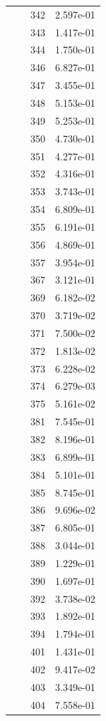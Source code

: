 \documentclass[12pt]{article}
\begin{document}
\begin{longtable}{@{}cccc@{}}
 &  & 342 & 2.597e-01 \\
 &  & 343 & 1.417e-01 \\
 &  & 344 & 1.750e-01 \\
 &  & 346 & 6.827e-01 \\
 &  & 347 & 3.455e-01 \\
 &  & 348 & 5.153e-01 \\
 &  & 349 & 5.253e-01 \\
 &  & 350 & 4.730e-01 \\
 &  & 351 & 4.277e-01 \\
 &  & 352 & 4.316e-01 \\
 &  & 353 & 3.743e-01 \\
 &  & 354 & 6.809e-01 \\
 &  & 355 & 6.191e-01 \\
 &  & 356 & 4.869e-01 \\
 &  & 357 & 3.954e-01 \\
 &  & 367 & 3.121e-01 \\
 &  & 369 & 6.182e-02 \\
 &  & 370 & 3.719e-02 \\
 &  & 371 & 7.500e-02 \\
 &  & 372 & 1.813e-02 \\
 &  & 373 & 6.228e-02 \\
 &  & 374 & 6.279e-03 \\
 &  & 375 & 5.161e-02 \\
 &  & 381 & 7.545e-01 \\
 &  & 382 & 8.196e-01 \\
 &  & 383 & 6.899e-01 \\
 &  & 384 & 5.101e-01 \\
 &  & 385 & 8.745e-01 \\
 &  & 386 & 9.696e-02 \\
 &  & 387 & 6.805e-01 \\
 &  & 388 & 3.044e-01 \\
 &  & 389 & 1.229e-01 \\
 &  & 390 & 1.697e-01 \\
 &  & 392 & 3.738e-02 \\
 &  & 393 & 1.892e-01 \\
 &  & 394 & 1.794e-01 \\
 &  & 401 & 1.431e-01 \\
 &  & 402 & 9.417e-02 \\
 &  & 403 & 3.349e-01 \\
 &  & 404 & 7.558e-01 \\

\end{longtable}
\end{document}
